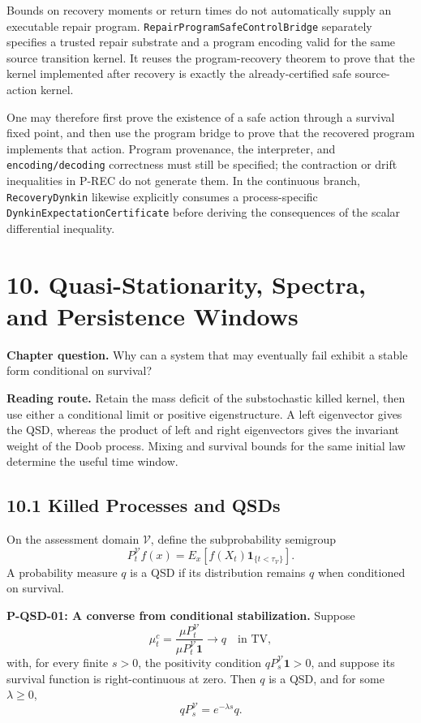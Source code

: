 \documentclass[
  english,
  11pt,
  oneside]{book}
\begin{document}
Bounds on recovery moments or return times do not automatically supply an executable repair program. \nolinkurl{RepairProgramSafeControlBridge} separately specifies a trusted repair substrate and a program encoding valid for the same source transition kernel. It reuses the program-recovery theorem to prove that the kernel implemented after recovery is exactly the already-certified safe source-action kernel.

One may therefore first prove the existence of a safe action through a survival fixed point, and then use the program bridge to prove that the recovered program implements that action. Program provenance, the interpreter, and \nolinkurl{encoding/decoding} correctness must still be specified; the contraction or drift inequalities in P-REC do not generate them. In the continuous branch, \nolinkurl{RecoveryDynkin} likewise explicitly consumes a process-specific \nolinkurl{DynkinExpectationCertificate} before deriving the consequences of the scalar differential inequality.

\chapter{10. Quasi-Stationarity, Spectra, and Persistence Windows}\label{ch-10}

\textbf{Chapter question.} Why can a system that may eventually fail exhibit a stable form conditional on survival?

\textbf{Reading route.} Retain the mass deficit of the substochastic killed kernel, then use either a conditional limit or positive eigenstructure. A left eigenvector gives the QSD, whereas the product of left and right eigenvectors gives the invariant weight of the Doob process. Mixing and survival bounds for the same initial law determine the useful time window.

\section{10.1 Killed Processes and QSDs}\label{killed-processes-and-qsds}

On the assessment domain \(\mathcal V\), define the subprobability semigroup \[P_t^{\mathcal V}f(x)=E_x[f(X_t)\mathbf1_{\{t<\tau_{\mathcal V}\}}].\] A probability measure \(q\) is a QSD if its distribution remains \(q\) when conditioned on survival.

\hypertarget{p-qsd-01}{}\label{p-qsd-01}

\textbf{P-QSD-01: A converse from conditional stabilization.} Suppose \[\mu_t^c=\frac{\mu P_t^{\mathcal V}}{\mu P_t^{\mathcal V}\mathbf1}
\longrightarrow q
\quad\text{in TV},\] with, for every finite \(s>0\), the positivity condition \(qP_s^{\mathcal V}\mathbf1>0\), and suppose its survival function is right-continuous at zero. Then \(q\) is a QSD, and for some \(\lambda\ge0\), \[qP_s^{\mathcal V}=e^{-\lambda s}q.\]
\end{document}
